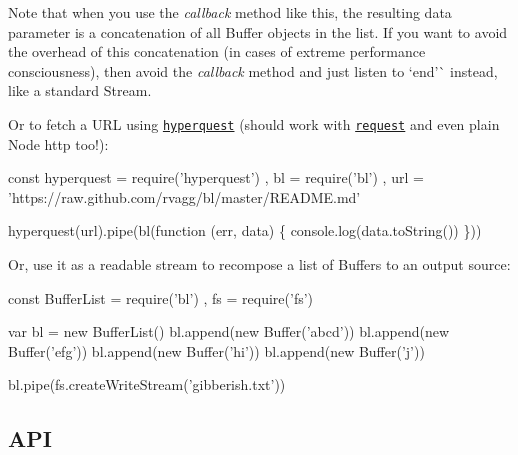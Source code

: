 Note that when you use the {\itshape callback} method like this, the resulting {\ttfamily data} parameter is a concatenation of all {\ttfamily Buffer} objects in the list. If you want to avoid the overhead of this concatenation (in cases of extreme performance consciousness), then avoid the {\itshape callback} method and just listen to `\textquotesingle{}end'\`{} instead, like a standard Stream.

Or to fetch a U\+RL using \href{https://github.com/substack/hyperquest}{\tt hyperquest} (should work with \href{http://github.com/mikeal/request}{\tt request} and even plain Node http too!)\+: 
\begin{DoxyCode}
const hyperquest = require('hyperquest')
    , bl         = require('bl')
    , url        = 'https://raw.github.com/rvagg/bl/master/README.md'

hyperquest(url).pipe(bl(function (err, data) \{
  console.log(data.toString())
\}))
\end{DoxyCode}


Or, use it as a readable stream to recompose a list of Buffers to an output source\+:


\begin{DoxyCode}
const BufferList = require('bl')
    , fs         = require('fs')

var bl = new BufferList()
bl.append(new Buffer('abcd'))
bl.append(new Buffer('efg'))
bl.append(new Buffer('hi'))
bl.append(new Buffer('j'))

bl.pipe(fs.createWriteStream('gibberish.txt'))
\end{DoxyCode}


\subsection*{A\+PI}


